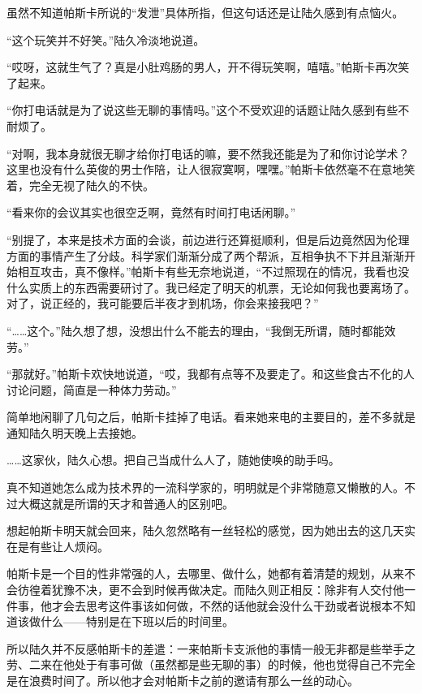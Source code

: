 虽然不知道帕斯卡所说的“发泄”具体所指，但这句话还是让陆久感到有点恼火。

“这个玩笑并不好笑。”陆久冷淡地说道。

“哎呀，这就生气了？真是小肚鸡肠的男人，开不得玩笑啊，嘻嘻。”帕斯卡再次笑了起来。

“你打电话就是为了说这些无聊的事情吗。”这个不受欢迎的话题让陆久感到有些不耐烦了。

“对啊，我本身就很无聊才给你打电话的嘛，要不然我还能是为了和你讨论学术？这里也没有什么英俊的男士作陪，让人很寂寞啊，嘿嘿。”帕斯卡依然毫不在意地笑着，完全无视了陆久的不快。

“看来你的会议其实也很空乏啊，竟然有时间打电话闲聊。”

“别提了，本来是技术方面的会谈，前边进行还算挺顺利，但是后边竟然因为伦理方面的事情产生了分歧。科学家们渐渐分成了两个帮派，互相争执不下并且渐渐开始相互攻击，真不像样。”帕斯卡有些无奈地说道，“不过照现在的情况，我看也没什么实质上的东西需要研讨了。我已经定了明天的机票，无论如何我也要离场了。对了，说正经的，我可能要后半夜才到机场，你会来接我吧？”

“……这个。”陆久想了想，没想出什么不能去的理由，“我倒无所谓，随时都能效劳。”

“那就好。”帕斯卡欢快地说道，“哎，我都有点等不及要走了。和这些食古不化的人讨论问题，简直是一种体力劳动。”

简单地闲聊了几句之后，帕斯卡挂掉了电话。看来她来电的主要目的，差不多就是通知陆久明天晚上去接她。

……这家伙，陆久心想。把自己当成什么人了，随她使唤的助手吗。

真不知道她怎么成为技术界的一流科学家的，明明就是个非常随意又懒散的人。不过大概这就是所谓的天才和普通人的区别吧。

想起帕斯卡明天就会回来，陆久忽然略有一丝轻松的感觉，因为她出去的这几天实在是有些让人烦闷。

帕斯卡是一个目的性非常强的人，去哪里、做什么，她都有着清楚的规划，从来不会彷徨着犹豫不决，更不会到时候再做决定。而陆久则正相反：除非有人交付他一件事，他才会去思考这件事该如何做，不然的话他就会没什么干劲或者说根本不知道该做什么——特别是在下班以后的时间里。

所以陆久并不反感帕斯卡的差遣：一来帕斯卡支派他的事情一般无非都是些举手之劳、二来在他处于有事可做（虽然都是些无聊的事）的时候，他也觉得自己不完全是在浪费时间了。所以他才会对帕斯卡之前的邀请有那么一丝的动心。\section*{}

